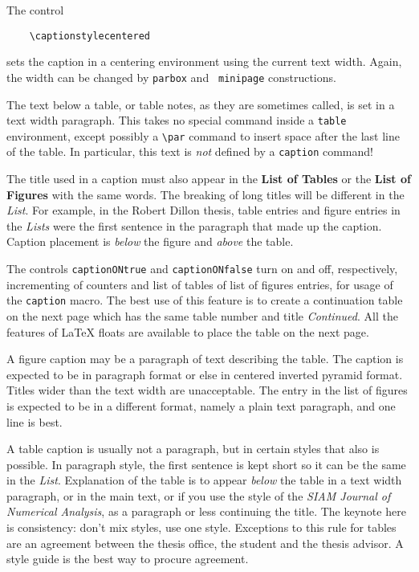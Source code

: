 The control

\verb"    \captionstylecentered"

sets the caption in a centering environment using the current text
width. Again, the width can be changed by {\tt parbox} and {\tt
minipage} constructions.

The text below a table, or table notes, as they are sometimes called, is
set in a text width paragraph. This takes no special command inside a
{\tt table} environment, except possibly a \verb"\par" command to insert
space after the last line of the table. In particular, this text is {\em
not} defined by a {\tt caption} command!

The title used in a caption must also appear in the {\bf List of Tables}
or the {\bf List of Figures} with the same words. The breaking of long
titles will be different in the {\em List}. For example, in the Robert
Dillon thesis, table entries and figure entries in the {\em Lists} were
the first sentence in the paragraph that made up the caption. Caption
placement is {\em below} the figure and {\em above} the table.

The controls {\tt captionONtrue} and {\tt captionONfalse} turn on and
off, respectively, incrementing of counters and list of tables of list
of figures entries, for usage of the {\tt caption} macro. The best use
of this feature is to create a continuation table on the next page which
has the same table number and title {\em Continued}. All the features of
\LaTeX{} floats are available to place the table on the next page.

A figure caption may be a paragraph of text describing the table. The
caption is expected to be in paragraph format or else in centered
inverted pyramid format. Titles wider than the text width are
unacceptable. The entry in the list of figures is expected to be in a
different format, namely a plain text paragraph, and one line is best.

A table caption is usually not a paragraph, but in certain styles that
also is possible. In paragraph style, the first sentence is kept short
so it can be the same in the {\em List}. Explanation of the table is to
appear {\em below} the table in a text width paragraph, or in the main
text, or if you use the style of the {\em SIAM Journal of Numerical
Analysis}, as a paragraph or less continuing the title. The keynote here
is consistency: don't mix styles, use one style. Exceptions to this rule
for tables are an agreement between the thesis office, the student and
the thesis advisor. A style guide is the best way to procure agreement.

